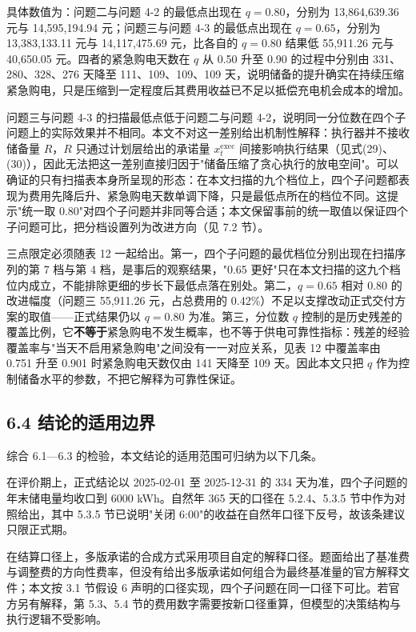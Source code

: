 \documentclass[12pt,a4paper]{ctexart}
\begin{document}
具体数值为：问题二与问题 4-2 的最低点出现在 $q=0.80$，分别为 13,864,639.36 元与 14,595,194.94 元；问题三与问题 4-3 的最低点出现在 $q=0.65$，分别为 13,383,133.11 元与 14,117,475.69 元，比各自的 $q=0.80$ 结果低 55,911.26 元与 40,650.05 元。四者的紧急购电天数在 $q$ 从 0.50 升至 0.90 的过程中分别由 331、280、328、276 天降至 111、109、109、109 天，说明储备的提升确实在持续压缩紧急购电，只是压缩到一定程度后其费用收益已不足以抵偿充电机会成本的增加。

问题三与问题 4-3 的扫描最低点低于问题二与问题 4-2，说明同一分位数在四个子问题上的实际效果并不相同。本文不对这一差别给出机制性解释：执行器并不接收储备量 $R$，$R$ 只通过计划层给出的承诺量 $x_t^{\mathrm{exec}}$ 间接影响执行结果（见式(29)、(30)），因此无法把这一差别直接归因于"储备压缩了贪心执行的放电空间"。可以确证的只有扫描表本身所呈现的形态：在本文扫描的九个档位上，四个子问题都表现为费用先降后升、紧急购电天数单调下降，只是最低点所在的档位不同。这提示"统一取 0.80"对四个子问题并非同等合适；本文保留事前的统一取值以保证四个子问题可比，把分档设置列为改进方向（见 7.2 节）。

三点限定必须随表 12 一起给出。第一，四个子问题的最优档位分别出现在扫描序列的第 7 档与第 4 档，是事后的观察结果，"0.65 更好"只在本文扫描的这九个档位内成立，不能排除更细的步长下最低点落在别处。第二，$q=0.65$ 相对 $0.80$ 的改进幅度（问题三 55,911.26 元，占总费用的 0.42\%）不足以支撑改动正式交付方案的取值——正式结果仍以 $q=0.80$ 为准。第三，分位数 $q$ 控制的是历史残差的覆盖比例，它\textbf{不等于}紧急购电不发生概率，也不等于供电可靠性指标：残差的经验覆盖率与"当天不启用紧急购电"之间没有一一对应关系，见表 12 中覆盖率由 0.751 升至 0.901 时紧急购电天数仅由 141 天降至 109 天。因此本文只把 $q$ 作为控制储备水平的参数，不把它解释为可靠性保证。

\subsection*{6.4 结论的适用边界}

综合 6.1—6.3 的检验，本文结论的适用范围可归纳为以下几条。

在评价期上，正式结论以 2025-02-01 至 2025-12-31 的 334 天为准，四个子问题的年末储电量均收口到 6000 kWh。自然年 365 天的口径在 5.2.4、5.3.5 节中作为对照给出，其中 5.3.5 节已说明"关闭 6:00"的收益在自然年口径下反号，故该条建议只限正式期。

在结算口径上，多版承诺的合成方式采用项目自定的解释口径。题面给出了基准费与调整费的方向性费率，但没有给出多版承诺如何组合为最终基准量的官方解释文件；本文按 3.1 节假设 6 声明的口径实现，四个子问题在同一口径下可比。若官方另有解释，第 5.3、5.4 节的费用数字需要按新口径重算，但模型的决策结构与执行逻辑不受影响。
\end{document}

